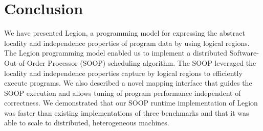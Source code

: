 \section{Conclusion}
\label{sec:conc}

We have presented Legion, a programming model for expressing
the abstract locality and independence properties of program
data by using logical regions.  The Legion programming model enabled us to implement
a distributed Software-Out-of-Order Processor (SOOP) scheduling 
algorithm.  The SOOP leveraged the locality and independence properties
capture by logical regions to efficiently execute programs.  We also
described a novel mapping interface that guides the SOOP execution
and allows tuning of program performance independent of correctness.
We demonstrated that our SOOP runtime implementation
of Legion was faster than existing implementations of
three benchmarks and that it was able to scale to distributed, heterogeneous
machines.


